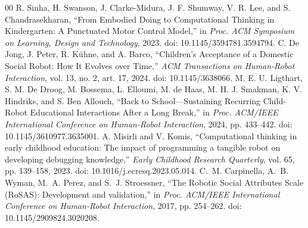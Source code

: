 \documentclass[conference,12pt,letterpaper]{IEEEtran}
\begin{document}
\begin{thebibliography}{00}
 R. Sinha, H. Swanson, J. Clarke-Midura, J. F. Shumway, V. R. Lee, and S. Chandrasekharan, ``From Embodied Doing to Computational Thinking in Kindergarten: A Punctuated Motor Control Model,'' in \textit{Proc. ACM Symposium on Learning, Design and Technology}, 2023. doi: 10.1145/3594781.3594794.
 C. De Jong, J. Peter, R. K\"uhne, and A. Barco, ``Children's Acceptance of a Domestic Social Robot: How It Evolves over Time,'' \textit{ACM Transactions on Human-Robot Interaction}, vol. 13, no. 2, art. 17, 2024. doi: 10.1145/3638066.
 M. E. U. Ligthart, S. M. De Droog, M. Bossema, L. Elloumi, M. de Haas, M. H. J. Smakman, K. V. Hindriks, and S. Ben Allouch, ``Back to School---Sustaining Recurring Child-Robot Educational Interactions After a Long Break,'' in \textit{Proc. ACM/IEEE International Conference on Human-Robot Interaction}, 2024, pp. 433--442. doi: 10.1145/3610977.3635001.
 A. Misirli and V. Komis, ``Computational thinking in early childhood education: The impact of programming a tangible robot on developing debugging knowledge,'' \textit{Early Childhood Research Quarterly}, vol. 65, pp. 139--158, 2023. doi: 10.1016/j.ecresq.2023.05.014.
 C.~M. Carpinella, A.~B. Wyman, M.~A. Perez, and S.~J. Stroessner, ``The Robotic Social Attributes Scale (RoSAS): Development and validation,'' in \textit{Proc. ACM/IEEE International Conference on Human-Robot Interaction}, 2017, pp. 254--262. doi: 10.1145/2909824.3020208.
\end{thebibliography}
\end{document}
